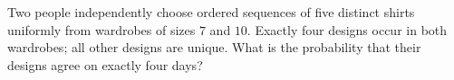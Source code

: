 Two people independently choose ordered sequences of five distinct shirts uniformly from wardrobes of sizes $7$ and $10$. Exactly four designs occur in both wardrobes; all other designs are unique. What is the probability that their designs agree on exactly four days?
